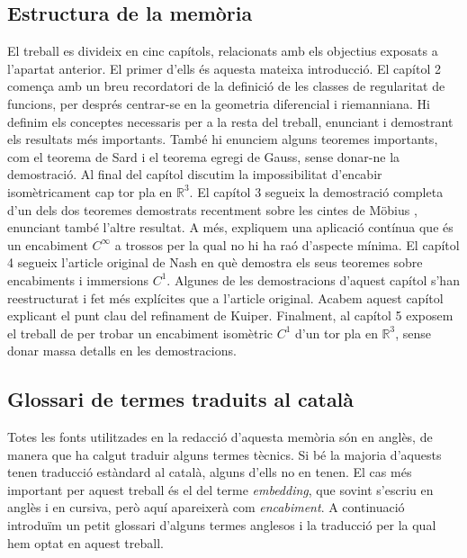 \subsection*{Estructura de la mem\`oria}
El treball es divideix en cinc capítols, relacionats amb els objectius exposats a l'apartat anterior. El primer d'ells és aquesta mateixa introducció. El capítol 2 comença amb un breu recordatori de la definició de les classes de regularitat de funcions, per després centrar-se en la geometria diferencial i riemanniana. Hi definim els conceptes necessaris per a la resta del treball, enunciant i demostrant els resultats més importants. També hi enunciem alguns teoremes importants, com el teorema de Sard i el teorema egregi de Gauss, sense donar-ne la demostració. Al final del capítol discutim la impossibilitat d'encabir isomètricament cap tor pla en $\mathbb R^3$. El capítol 3 segueix la demostració completa d'un dels dos teoremes demostrats recentment sobre les cintes de Möbius \cite{schwartz2024}, enunciant també l'altre resultat. A més, expliquem una aplicació contínua que és un encabiment $C^\infty$ a trossos per la qual no hi ha raó d'aspecte mínima. El capítol 4 segueix l'article original de Nash en què demostra els seus teoremes sobre encabiments i immersions $C^1$. Algunes de les demostracions d'aquest capítol s'han reestructurat i fet més explícites que a l'article original. Acabem aquest capítol explicant el punt clau del refinament de Kuiper. Finalment, al capítol 5 exposem el treball de \citet{borrelli2013} per trobar un encabiment isomètric $C^1$ d'un tor pla en $\mathbb R^3$, sense donar massa detalls en les demostracions. 
\subsection*{Glossari de termes traduits al català}
Totes les fonts utilitzades en la redacció d'aquesta memòria són en anglès, de manera que ha calgut traduir alguns termes tècnics. Si bé la majoria d'aquests tenen traducció estàndard al català, alguns d'ells no en tenen. El cas més important per aquest treball és el del terme \textit{embedding}, que sovint s'escriu en anglès i en cursiva, però aquí apareixerà com \textit{encabiment}. A continuació introduïm un petit glossari d'alguns termes anglesos i la traducció per la qual hem optat en aquest treball. 

